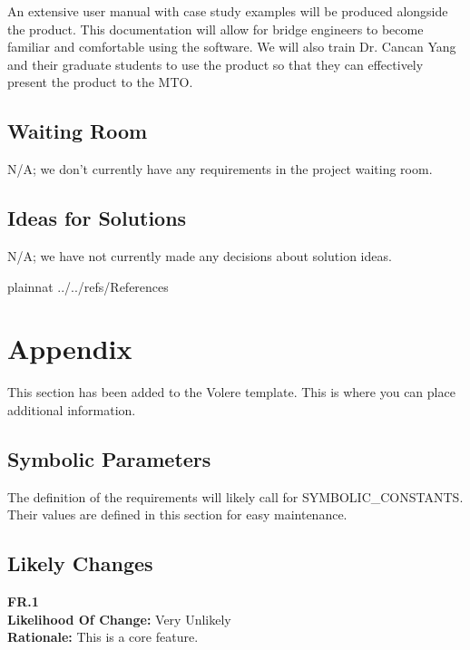 \documentclass[12pt]{article}
\begin{document}
An extensive user manual with case study examples will be produced alongside the product. This documentation will allow for bridge engineers to become familiar and comfortable using the software.
We will also train Dr. Cancan Yang and their graduate students to use the product so that they can effectively present the product to the MTO.

\subsection{Waiting Room}

N/A; we don't currently have any requirements in the project waiting room.

\subsection{Ideas for Solutions}

N/A; we have not currently made any decisions about solution ideas.

\newpage

 {plainnat}
 {../../refs/References}

\newpage

\section{Appendix}

This section has been added to the Volere template.  This is where you can place
additional information.

\subsection{Symbolic Parameters}

The definition of the requirements will likely call for SYMBOLIC\_CONSTANTS.
Their values are defined in this section for easy maintenance.

\subsection{Likely Changes}

  \textbf{FR.1}\\  
  \textbf{Likelihood Of Change:} Very Unlikely\\ 
  \textbf{Rationale:} This is a core feature.\\\\
\end{document}
